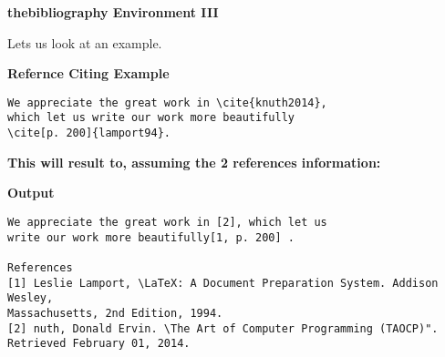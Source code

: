 \begin{frame}[t,fragile]{\textbf{thebibliography Environment III}}


Lets us look at an example.

\scriptsize
\begin{varblock}[9cm]{\textbf{Refernce Citing Example}}
\vspace{-0.3cm}
\begin{verbatim}
We appreciate the great work in \cite{knuth2014}, 
which let us write our work more beautifully
\cite[p. 200]{lamport94}. 
\end{verbatim}
\vspace{-0.3cm}
\end{varblock}


\textbf{This will result to, assuming the 2 references information:}

\begin{varblock}[11cm]{\textbf{Output}}
\vspace{-0.3cm}
\begin{verbatim}
We appreciate the great work in [2], which let us 
write our work more beautifully[1, p. 200] .

References
[1] Leslie Lamport, \LaTeX: A Document Preparation System. Addison Wesley, 
Massachusetts, 2nd Edition, 1994.
[2] nuth, Donald Ervin. \The Art of Computer Programming (TAOCP)".
Retrieved February 01, 2014.
\end{verbatim}
\vspace{-0.3cm}
\end{varblock}


\end{frame}

